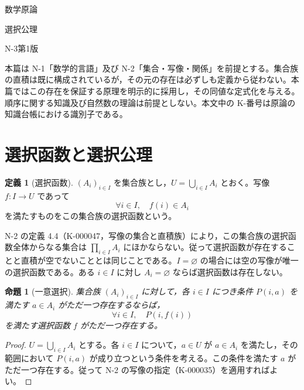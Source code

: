 \documentclass[a5paper,10pt,dvipdfmx]{jsarticle}
\theoremstyle{definition}
\newtheorem{defn}[ruledef]{定義}
\theoremstyle{plain}
\newtheorem{prop}[ruledef]{命題}
\begin{document}
\begin{center}
{\small 数学原論}\par\vspace{4mm}
{\LARGE 選択公理}\par\vspace{2mm}
{\small N-3\quad 第1版}
\end{center}
\noindent 本篇は N-1「数学的言語」及び N-2「集合・写像・関係」を前提とする。集合族の直積は既に構成されているが，その元の存在は必ずしも定義から従わない。本篇ではこの存在を保証する原理を明示的に採用し，その同値な定式化を与える。順序に関する知識及び自然数の理論は前提としない。本文中の K-番号は原論の知識台帳における識別子である。
\section{選択函数と選択公理}
\begin{defn}[選択函数]\label{k57}
$(A_i)_{i\in I}$ を集合族とし，$U=\bigcup_{i\in I}A_i$ とおく。写像 $f:I\to U$ であって
\[
 \forall i\in I,\quad f(i)\in A_i
\]
を満たすものをこの集合族の選択函数という。
\end{defn}
N-2 の定義 4.4（K-000047，写像の集合と直積族）により，この集合族の選択函数全体からなる集合は $\prod_{i\in I}A_i$ にほかならない。従って選択函数が存在することと直積が空でないこととは同じことである。$I=\varnothing$ の場合には空の写像が唯一の選択函数である。ある $i\in I$ に対し $A_i=\varnothing$ ならば選択函数は存在しない。
\begin{prop}[一意選択]\label{k58}
集合族 $(A_i)_{i\in I}$ に対して，各 $i\in I$ につき条件 $P(i,a)$ を満たす $a\in A_i$ がただ一つ存在するならば，
\[
 \forall i\in I,\quad P(i,f(i))
\]
を満たす選択函数 $f$ がただ一つ存在する。
\end{prop}
\begin{proof}
$U=\bigcup_{i\in I}A_i$ とする。各 $i\in I$ について，$a\in U$ が $a\in A_i$ を満たし，その範囲において $P(i,a)$ が成り立つという条件を考える。この条件を満たす $a$ がただ一つ存在する。従って N-2 の写像の指定（K-000035）を適用すればよい。
\end{proof}
\end{document}
